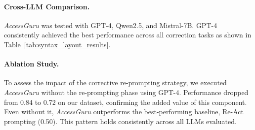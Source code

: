 \documentclass[sigconf, nonacm]{acmart}
\newcommand{\method}{\emph{AccessGuru}}
\begin{document}
\paragraph{Cross-LLM Comparison.} \method{} was tested with GPT-4, Qwen2.5, and Mistral-7B. GPT-4 consistently achieved the best performance across all correction tasks as shown in Table~\ref{tab:syntax_layout_results}. 


\paragraph{Ablation Study.} To assess the impact of the corrective re-prompting strategy, we executed \method{} without the re-prompting phase using GPT-4. Performance dropped from 0.84 to 0.72 on our dataset, confirming the added value of this component. Even without it, \method{} outperforms the best-performing baseline, Re-Act prompting (0.50). This pattern holds consistently across all LLMs evaluated.
\end{document}
